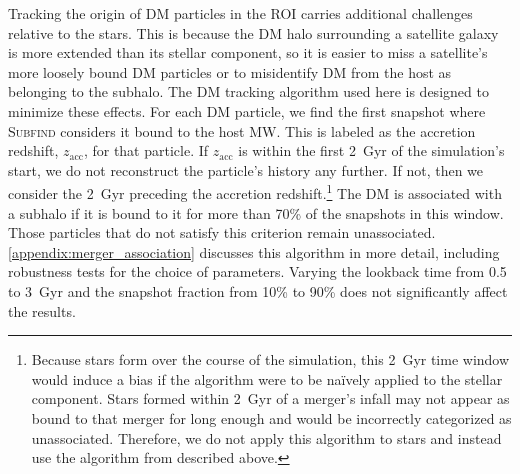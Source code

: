 \documentclass[twocolumn,tighten,twocolappendix]{aastex701}
\newcommand{\zacc}[1]{\ensuremath{z_\mathrm{acc}}}
\newcommand{\subfind}{\textsc{Subfind}}
\begin{document}
Tracking the origin of DM particles in the ROI carries additional challenges relative to the stars. This is because the DM halo surrounding a satellite galaxy is more extended than its  stellar component, so it is easier to miss a satellite's more loosely bound DM particles or to misidentify DM from the host as belonging to the subhalo. The DM tracking algorithm used here is designed to minimize these effects.  For each DM particle, we find the first snapshot where \subfind{} considers it bound to the host MW.  This is labeled as the accretion redshift, \zacc{}, for that particle. If \zacc{} is within the first 2~Gyr of the simulation's start, we do not reconstruct the particle's history any further. If not, then we consider the 2~Gyr preceding the accretion redshift.\footnote{Because stars form over the course of the simulation, this 2~Gyr time window would induce a bias if the algorithm were to be na\"ively applied to the stellar component. Stars formed within 2~Gyr of a merger's infall may not appear as bound to that merger for long enough and would be incorrectly categorized as unassociated. Therefore, we do not apply this algorithm to stars and instead use the algorithm from \citet{2025ApJ...983..119F} described above.} The DM is associated with a subhalo if it is bound to it for more than 70\% of the snapshots in this window.  Those particles that do not satisfy this criterion remain unassociated. \autoref{appendix:merger_association} discusses this algorithm in more detail, including robustness tests for the choice of parameters.  Varying the lookback time from 0.5 to 3~Gyr and the snapshot fraction from 10\% to 90\% does not significantly affect the results.
\end{document}
